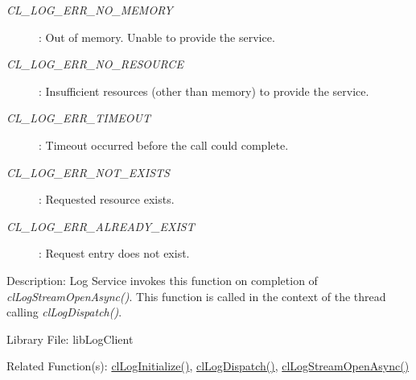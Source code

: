 \begin{flushleft}
\begin{itemize}
\begin{Desc}
\begin{description}
\item[{\em CL\_\-LOG\_\-ERR\_\-NO\_\-MEMORY}]: Out of memory. Unable to provide the service.
\item[{\em CL\_\-LOG\_\-ERR\_\-NO\_\-RESOURCE}]: Insufficient resources (other than memory) to provide the service.
\item[{\em CL\_\-LOG\_\-ERR\_\-TIMEOUT}]: Timeout occurred before the call could complete.
\item[{\em CL\_\-LOG\_\-ERR\_\-NOT\_\-EXISTS}]: Requested resource exists.
\item[{\em CL\_\-LOG\_\-ERR\_\-ALREADY\_\-EXIST}]: Request entry does not exist.
\end{description}
\end{Desc}
\begin{Desc}
\item[Description:] Log Service invokes this function on completion of \textit{clLogStreamOpenAsync()}. This function is called in the context of 
the thread calling \textit{clLogDispatch()}.
\end{Desc}
\begin{Desc}
\item[Library File:] libLogClient\end{Desc}
\begin{Desc}
\item[Related Function(s):]\hyperlink{pagelog101}{clLogInitialize()}, \hyperlink{pagelog103}{clLogDispatch()}, 
\hyperlink{pagelog106}{clLogStreamOpenAsync()}\end{Desc}
\newpage




\end{itemize}
\end{flushleft}

